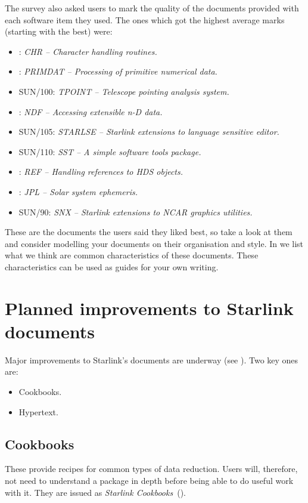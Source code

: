 The survey also asked users to mark the quality of the documents provided with
each software item they used.
The ones which got the highest average marks (starting with the best) were:
\begin{itemize}
\item {}: {\em CHR -- Character handling routines.}
\item {}: {\em PRIMDAT -- Processing of primitive numerical data.}
\item SUN/100: {\em TPOINT -- Telescope pointing analysis system.}
\item {}: {\em NDF -- Accessing extensible n-D data.}
\item SUN/105: {\em STARLSE -- Starlink extensions to language sensitive editor.}
\item SUN/110: {\em SST -- A simple software tools package.}
\item {}: {\em REF -- Handling references to HDS objects.}
\item {}: {\em JPL -- Solar system ephemeris.}
\item SUN/90: {\em SNX -- Starlink extensions to NCAR graphics utilities.}
\end{itemize}
These are the documents the users said they liked best, so take a look at them
and consider modelling your documents on their organisation and style.
In  we list what we think are common
characteristics of these documents.
These characteristics can be used as guides for your own writing.

\section{Planned improvements to Starlink documents}

Major improvements to Starlink's documents are underway
(see ).
Two key ones are:

\begin{itemize}
\item Cookbooks.
\item Hypertext.
\end{itemize}

\subsection{Cookbooks}

These provide recipes for common types of data reduction.
Users will, therefore, not need to understand a package in depth before being
able to do useful work with it.
They are issued as {\em Starlink Cookbooks}\,
().

